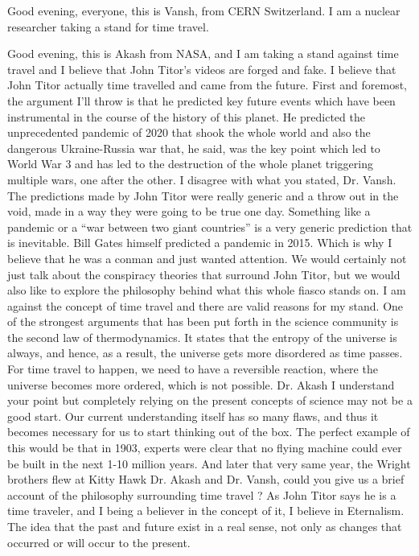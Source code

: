 \begin{drama}
    \sctwospeaks Good evening, everyone, this is Vansh, from CERN Switzerland. I am a nuclear researcher taking a stand for time travel.

    \sconespeaks Good evening, this is Akash from NASA, and I am taking a stand against time travel and I believe that John Titor’s videos are forged and fake.
    \sctwospeaks I believe that John Titor actually time travelled and came from the future. First and foremost, the argument I’ll throw is that he predicted key future events which have been instrumental in the course of the history of this planet. He predicted the unprecedented pandemic of 2020 that shook the whole world and also the dangerous Ukraine-Russia war that, he said, was the key point which led to World War 3 and has led to the destruction of the whole planet triggering multiple wars, one after the other.
    \sconespeaks I disagree with what you stated, Dr. Vansh. The predictions made by John Titor were really generic and a throw out in the void, made in a way they were going to be true one day. Something like a pandemic or a “war between two giant countries” is a very generic prediction that is inevitable. Bill Gates himself predicted a pandemic in 2015. Which is why I believe that he was a conman and just wanted attention.
    \repspeaks We would certainly not just talk about the conspiracy theories that surround John Titor, but we would also like to explore the philosophy behind what this whole fiasco stands on.
    \sconespeaks I am against the concept of time travel and there are valid reasons for my stand. One of the strongest arguments that has been put forth in the science community is the second law of thermodynamics. It states that the entropy of the universe is always, and hence, as a result, the universe gets more disordered as time passes. For time travel to happen, we need to have a reversible reaction, where the universe becomes more ordered, which is not possible.
    \sctwospeaks Dr. Akash I understand your point but completely relying on the present concepts of science may not be a good start. Our current understanding itself has so many flaws, and thus it becomes necessary for us to start thinking out of the box. The perfect example of this would be that in 1903, experts were clear that no flying machine could ever be built in the next 1-10 million years. And later that very same year, the Wright brothers flew at Kitty Hawk
    \repspeaks Dr. Akash and Dr. Vansh, could you give us a brief account of the philosophy surrounding time travel ?
    \sctwospeaks As John Titor says he is a time traveler, and I being a believer in the concept of it, I believe in Eternalism. The idea that the past and future exist in a real sense, not only as changes that occurred or will occur to the present.

\end{drama}
